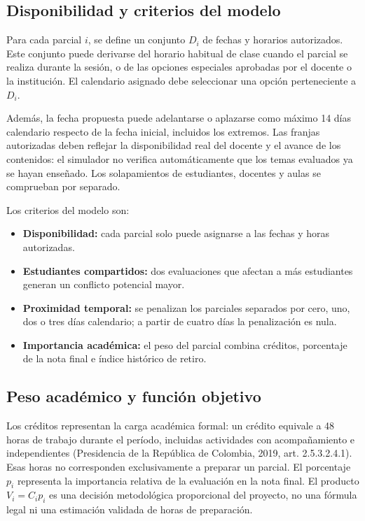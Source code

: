 \documentclass[12pt,letterpaper]{article}
\begin{document}
\subsection{Disponibilidad y criterios del modelo}
Para cada parcial $i$, se define un conjunto $D_i$ de fechas y horarios autorizados. Este conjunto puede derivarse del horario habitual de clase cuando el parcial se realiza durante la sesión, o de las opciones especiales aprobadas por el docente o la institución. El calendario asignado debe seleccionar una opción perteneciente a $D_i$.

Además, la fecha propuesta puede adelantarse o aplazarse como máximo 14 días calendario respecto de la fecha inicial, incluidos los extremos. Las franjas autorizadas deben reflejar la disponibilidad real del docente y el avance de los contenidos: el simulador no verifica automáticamente que los temas evaluados ya se hayan enseñado. Los solapamientos de estudiantes, docentes y aulas se comprueban por separado.

Los criterios del modelo son:
\begin{itemize}
  \item \textbf{Disponibilidad:} cada parcial solo puede asignarse a las fechas y horas autorizadas.
  \item \textbf{Estudiantes compartidos:} dos evaluaciones que afectan a más estudiantes generan un conflicto potencial mayor.
  \item \textbf{Proximidad temporal:} se penalizan los parciales separados por cero, uno, dos o tres días calendario; a partir de cuatro días la penalización es nula.
  \item \textbf{Importancia académica:} el peso del parcial combina créditos, porcentaje de la nota final e índice histórico de retiro.
\end{itemize}

\subsection{Peso académico y función objetivo}
Los créditos representan la carga académica formal: un crédito equivale a 48 horas de trabajo durante el período, incluidas actividades con acompañamiento e independientes (Presidencia de la República de Colombia, 2019, art. 2.5.3.2.4.1). Esas horas no corresponden exclusivamente a preparar un parcial. El porcentaje $p_i$ representa la importancia relativa de la evaluación en la nota final. El producto $V_i=C_i p_i$ es una decisión metodológica proporcional del proyecto, no una fórmula legal ni una estimación validada de horas de preparación.
\end{document}
